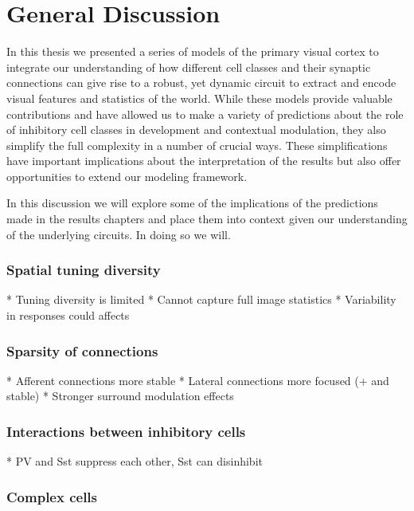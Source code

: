 \chapter{General Discussion}

In this thesis we presented a series of models of the primary visual
cortex to integrate our understanding of how different cell classes
and their synaptic connections can give rise to a robust, yet dynamic
circuit to extract and encode visual features and statistics of the
world. While these models provide valuable contributions and have
allowed us to make a variety of predictions about the role of
inhibitory cell classes in development and contextual modulation, they
also simplify the full complexity in a number of crucial ways. These
simplifications have important implications about the interpretation
of the results but also offer opportunities to extend our modeling
framework.

In this discussion we will explore some of the implications of the
predictions made in the results chapters and place them into context
given our understanding of the underlying circuits. In doing so we
will.


\subsection{Spatial tuning diversity}

* Tuning diversity is limited
* Cannot capture full image statistics
* Variability in responses could affects


\subsection{Sparsity of connections}

* Afferent connections more stable
* Lateral connections more focused (+ and stable)
* Stronger surround modulation effects

\subsection{Interactions between inhibitory cells}

* PV and Sst suppress each other, Sst can disinhibit

\subsection{Complex cells}


